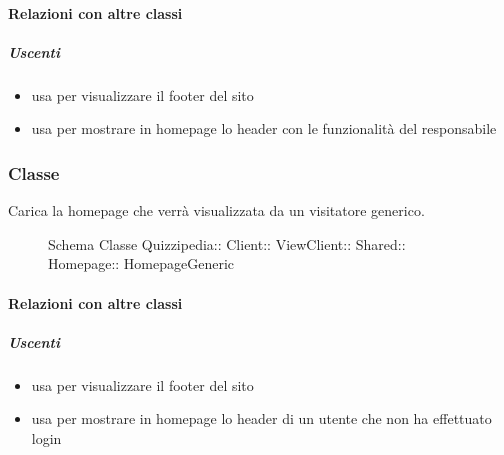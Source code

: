 \paragraph{Relazioni con altre classi}
\subparagraph{Uscenti}
\begin{itemize}
\item usa  per visualizzare il footer del sito
\item usa  per mostrare in homepage lo header con le funzionalità del responsabile
\end{itemize}
\subsubsection{Classe }
Carica la homepage che verrà visualizzata da un visitatore generico.
\begin{figure}[H]
\centering
\noindent{}
\caption[Schema Classe HomepageGeneric]{Schema Classe Quizzipedia:: Client:: ViewClient:: Shared:: Homepage:: HomepageGeneric}
\end{figure}
\paragraph{Relazioni con altre classi}
\subparagraph{Uscenti}
\begin{itemize}
\item usa  per visualizzare il footer del sito
\item usa  per mostrare in homepage lo header di un utente che non ha effettuato login
\end{itemize}
